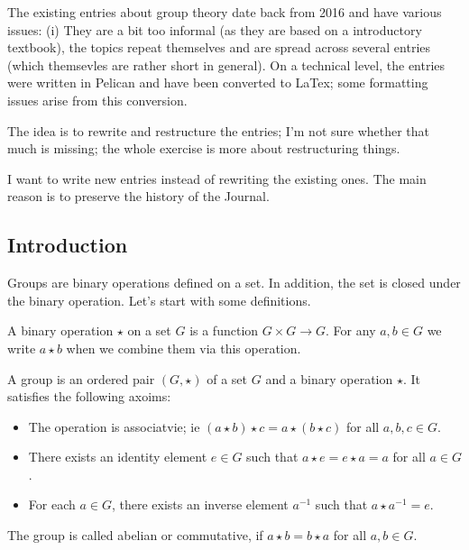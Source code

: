 
The existing entries about group theory date back from 2016 and have various issues: (i) They are a bit too informal (as they are based on a introductory textbook), the topics repeat themselves and are spread across several entries (which themsevles are rather short in general). On a technical level, the entries were written in Pelican and have been converted to LaTex; some formatting issues arise from this conversion.

The idea is to rewrite and restructure the entries; I'm not sure whether that much is missing; the whole exercise is more about restructuring things.

I want to write new entries instead of rewriting the existing ones. The main reason is to preserve the history of the Journal.

\subsection{Introduction}

Groups are binary operations defined on a set. In addition, the set is closed under the binary operation. Let's start with some definitions.

\begin{definition}
A binary operation $\star$ on a set $G$ is a function $G \times G \rightarrow G$. For any $a, b \in G$ we write $a \star b$ when we combine them via this operation. 
\end{definition}


\begin{definition}
A group is an ordered pair $(G, \star)$ of a set $G$ and a binary operation $\star$. It satisfies the following axoims:

\begin{itemize}

\item The operation is associatvie; ie $(a \star b) \star c = a \star (b \star c)$ for all $a, b, c \in G$.
\item There exists an identity element $e \in G$ such that $a \star e = e \star a = a$ for all $a \in G$.
\item For each $a \in G$, there exists an inverse element $a^{-1}$ such that $a \star a^{-1} = e$.

\end{itemize}

The group is called abelian or commutative, if $a \star b = b \star a$ for all $a, b \in G$.

\end{definition}


